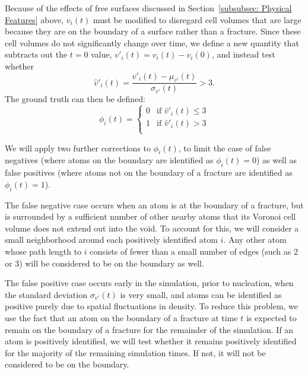 Because of the effects of free surfaces discussed in Section~\ref{subsubsec: Physical Features} above, $v_i(t)$ must be modified to disregard cell volumes that are large because they are on the boundary of a surface rather than a fracture.  Since these cell volumes do not significantly change over time, we define a new quantity that subtracts out the $t=0$ value, $v'_i(t) = v_i(t)-v_i(0)$, and instead test whether
\begin{equation}
    \label{eqn: cell volume}
    \hat{v}'_i(t) = \frac{v'_i(t) - \mu_{v'}(t)}{\sigma_{v'}(t)} > 3.
\end{equation}
The ground truth can then be defined:
\begin{equation}
    \label{eqn: ground truth}
    \phi_i(t) = \begin{cases}
      0 & \text{if }\hat{v}'_i(t) \le 3 \\
      1 & \text{if }\hat{v}'_i(t) > 3 \\
    \end{cases} 
\end{equation}

We will apply two further corrections to $\phi_i(t)$, to limit the case of false negatives (where atoms on the boundary are identified as $\phi_i(t)=0$) as well as false positives (where atoms not on the boundary of a fracture are identified as $\phi_i(t)=1$).

The false negative case occurs when an atom is at the boundary of a fracture, but is surrounded by a sufficient number of other nearby atoms that its Voronoi cell volume does not extend out into the void.  To account for this, we will consider a small neighborhood around each positively identified atom $i$.  Any other atom whose path length to $i$ consists of fewer than a small number of edges (such as 2 or 3) will be considered to be on the boundary as well.

The false positive case occurs early in the simulation, prior to nucleation, when the standard deviation $\sigma_{v'}(t)$ is very small, and atoms can be identified as positive purely due to spatial fluctuations in density.  To reduce this problem, we use the fact that an atom on the boundary of a fracture at time $t$ is expected to remain on the boundary of a fracture for the remainder of the simulation.  If an atom is positively identified, we will test whether it remains positively identified for the majority of the remaining simulation times.  If not, it will not be considered to be on the boundary.

